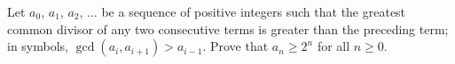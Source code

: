 Let $ a_0$,  $ a_1$,  $ a_2$,  $ \ldots$ be a sequence of positive integers such that the greatest common divisor of any two consecutive terms is greater than the preceding term; in symbols, $ \gcd (a_i, a_{i + 1}) > a_{i - 1}$. Prove that $ a_n\ge 2^n$ for all $ n\ge 0$.